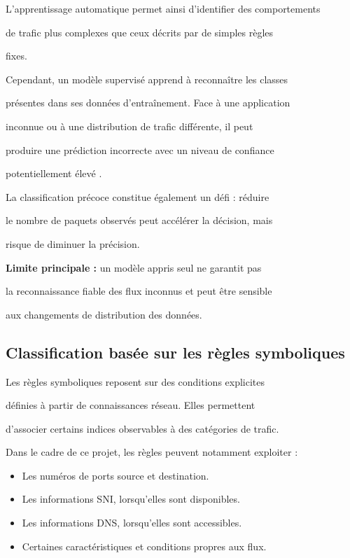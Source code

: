 L'apprentissage automatique permet ainsi d'identifier des comportements

de trafic plus complexes que ceux décrits par de simples règles

fixes.



Cependant, un modèle supervisé apprend à reconnaître les classes

présentes dans ses données d'entraînement. Face à une application

inconnue ou à une distribution de trafic différente, il peut

produire une prédiction incorrecte avec un niveau de confiance

potentiellement élevé \cite{scheirer2013,hendrycks2017}.



La classification précoce constitue également un défi : réduire

le nombre de paquets observés peut accélérer la décision, mais

risque de diminuer la précision.



\textbf{Limite principale :} un modèle appris seul ne garantit pas

la reconnaissance fiable des flux inconnus et peut être sensible

aux changements de distribution des données.



\subsection{Classification basée sur les règles symboliques}



Les règles symboliques reposent sur des conditions explicites

définies à partir de connaissances réseau. Elles permettent

d'associer certains indices observables à des catégories de trafic.



Dans le cadre de ce projet, les règles peuvent notamment exploiter :



\begin{itemize}

    \item Les numéros de ports source et destination.

    \item Les informations SNI, lorsqu'elles sont disponibles.

    \item Les informations DNS, lorsqu'elles sont accessibles.

    \item Certaines caractéristiques et conditions propres aux flux.

\end{itemize}



